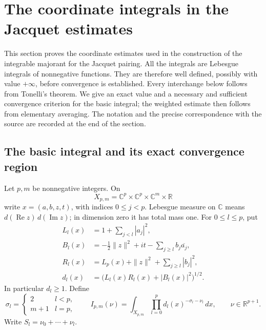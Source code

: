 \section{The coordinate integrals in the Jacquet estimates}
\label{jk-section}

This section proves the coordinate estimates used in the
construction of the integrable majorant for the Jacquet pairing.
All the integrals are Lebesgue integrals of nonnegative functions.
They are therefore well defined, possibly with value \(+\infty\),
before convergence is established.  Every interchange below follows
from Tonelli's theorem.  We give an exact value and a necessary and
sufficient convergence criterion for the basic integral; the
weighted estimate then follows from elementary averaging.
The notation and the precise correspondence with the source are
recorded at the end of the section.

\subsection{The basic integral and its exact convergence region}

Let \(p,m\) be nonnegative integers.  On
\[
 X_{p,m}=\mathbb C^p\times\mathbb C^p\times
                  \mathbb C^m\times\mathbb R
\]
write \(x=(a,b,z,t)\), with indices \(0\leq j<p\).
Lebesgue measure on \(\mathbb C\) means
\(d(\operatorname{Re}z)\,d(\operatorname{Im}z)\);
in dimension zero it has total mass one.
For \(0\leq l\leq p\), put
\begin{align}
 L_l(x)&=1+\sum_{j<l}|a_j|^2,\nonumber\\
 B_l(x)&=-\tfrac12\|z\|^2+it-\sum_{j\geq l}b_j\overline{a_j},
       \label{jk-coordinates}\\
 R_l(x)&=L_p(x)+\|z\|^2+\sum_{j\geq l}|b_j|^2,\nonumber\\
 d_l(x)&=\bigl(L_l(x)R_l(x)+|B_l(x)|^2\bigr)^{1/2}.
       \nonumber
\end{align}
In particular \(d_l\geq1\).  Define
\[
 \sigma_l=\begin{cases}2&l<p,\\m+1&l=p,\end{cases}
 \qquad
 I_{p,m}(\nu)=
       \int_{X_{p,m}}\prod_{l=0}^{p}d_l(x)^{-\sigma_l-\nu_l}\,dx,
       \qquad \nu\in\mathbb R^{p+1}.
\]
Write \(S_l=\nu_0+\cdots+\nu_l\).

